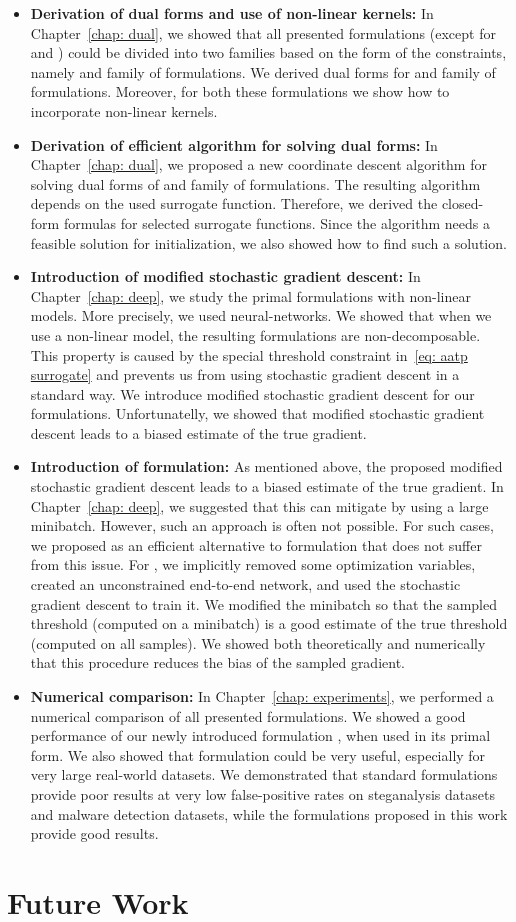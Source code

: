 \begin{itemize}
  \item \textbf{Derivation of dual forms and use of non-linear kernels:} In Chapter~\ref{chap: dual}, we showed that all presented formulations (except for \Grill and \GrillNP) could be divided into two families based on the form of the constraints, namely \TopPushK and \PatMat family of formulations. We derived dual forms for \TopPushK and \PatMat family of formulations. Moreover, for both these formulations we show how to incorporate non-linear kernels.
  \item \textbf{Derivation of efficient algorithm for solving dual forms:} In Chapter~\ref{chap: dual}, we proposed a new coordinate descent algorithm for solving dual forms of \TopPushK and \PatMat family of formulations. The resulting algorithm depends on the used surrogate function. Therefore, we derived the closed-form formulas for selected surrogate functions. Since the algorithm needs a feasible solution for initialization, we also showed how to find such a solution.
  \item \textbf{Introduction of modified stochastic gradient descent:} In Chapter~\ref{chap: deep}, we study the primal formulations with non-linear models. More precisely, we used neural-networks. We showed that when we use a non-linear model, the resulting formulations are non-decomposable. This property is caused by the special threshold constraint in~\eqref{eq: aatp surrogate} and prevents us from using stochastic gradient descent in a standard way. We introduce modified stochastic gradient descent for our formulations. Unfortunatelly, we showed that modified stochastic gradient descent leads to a biased estimate of the true gradient. 
  \item \textbf{Introduction of \DeepTopPush formulation:} As mentioned above, the proposed modified stochastic gradient descent leads to a biased estimate of the true gradient. In Chapter~\ref{chap: deep}, we suggested that this can mitigate by using a large minibatch. However, such an approach is often not possible. For such cases, we proposed \DeepTopPush as an efficient alternative to \TopPush formulation that does not suffer from this issue. For \DeepTopPush, we implicitly removed some optimization variables, created an unconstrained end-to-end network, and used the stochastic gradient descent to train it. We modified the minibatch so that the sampled threshold (computed on a minibatch) is a good estimate of the true threshold (computed on all samples). We showed both theoretically and numerically that this procedure reduces the bias of the sampled gradient.
  \item \textbf{Numerical comparison:} In Chapter~\ref{chap: experiments}, we performed a numerical comparison of all presented formulations. We showed a good performance of our newly introduced formulation \PatMatNP, when used in its primal form. We also showed that \DeepTopPush formulation could be very useful, especially for very large real-world datasets. We demonstrated that standard formulations provide poor results at very low false-positive rates on steganalysis datasets and malware detection datasets, while the formulations proposed in this work provide good results.
\end{itemize}

\section*{Future Work}
